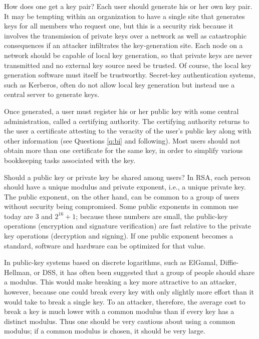 {How does one get a key pair? }
Each user should generate his or her own key pair. It may be tempting within 
an organization to have a single site that generates keys for all members who 
request one, but this is a security risk because it involves the transmission 
of private keys over a network as well as catastrophic consequences if an 
attacker infiltrates the key-generation site. Each node on a network should be
capable of local key generation, so that private keys are never transmitted 
and no external key source need be trusted. Of course, the local key generation
software must itself be trustworthy. Secret-key authentication systems, such 
as Kerberos, often do not allow local key generation but instead use a 
central server to generate keys.

Once generated, a user must register his or her public key with some
central administration, called a certifying authority. The certifying 
authority returns to the user a certificate attesting to the veracity of 
the user's public key along with other information (see Questions \ref{q:bi} 
and following). Most users should not obtain more than one certificate for
the same key, in order to simplify various bookkeeping tasks associated
with the key.

{Should a public key or private key be shared among users?}
In RSA, each person should have a unique modulus and private exponent, i.e., 
a unique private key. The public exponent, on the other hand, can be common 
to a group of users without security being compromised. Some public exponents 
in common use today are 3 and $2^{16}+1$; because these numbers are small, 
the public-key operations (encryption and signature verification) are fast 
relative to the private key operations (decryption and signing). If one 
public exponent becomes a standard, software and hardware can be optimized 
for that value.

In public-key systems based on discrete logarithms, such as ElGamal,
Diffie-Hellman, or DSS, it has often been suggested that a group of 
people should share a modulus. This would make breaking a key more
attractive to an attacker, however, because one could break every
key with only slightly more effort than it would take to break a
single key. To an attacker, therefore, the average cost to break a 
key is much lower with a common modulus than if every key has a distinct 
modulus. Thus one should be very cautious about using a common modulus; 
if a common modulus is chosen, it should be very large. 

